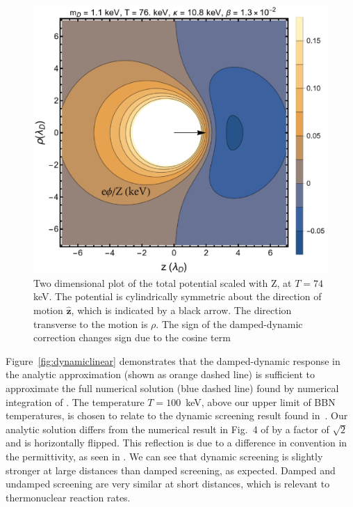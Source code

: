 \begin{figure} 
 \centerline{\includegraphics[width=.90\linewidth]{plots/chap03BBN/Pot_2DPlotFix.png}}
 \caption{Two dimensional plot of the total potential  scaled with Z, at $T=74\,$keV. The potential is cylindrically symmetric about the direction of motion $\boldsymbol{\hat{z}}$, which is indicated by a black arrow. The direction transverse to the motion is $\rho$. The sign of the damped-dynamic correction  changes sign due to the cosine term}
 \label{fig:numericalComp}
\end{figure} 

Figure~\ref{fig:dynamiclinear} demonstrates that the damped-dynamic response in the analytic approximation  (shown as orange dashed line) is sufficient to approximate the full numerical solution (blue dashed line) found by numerical integration of . The temperature $T = 100$\, keV, above our upper limit of BBN temperatures, is chosen to relate to the dynamic screening result found in~\cite{Hwang:2021kno}. Our analytic solution differs from the numerical result in Fig.~4 of \cite{Hwang:2021kno} by a factor of $\sqrt{2}$ and is horizontally flipped. This reflection is due to a difference in convention in the permittivity, as seen in . We can see that dynamic screening is slightly stronger at large distances than damped screening, as expected. Damped and undamped screening are very similar at short distances, which is relevant to thermonuclear reaction rates. 

